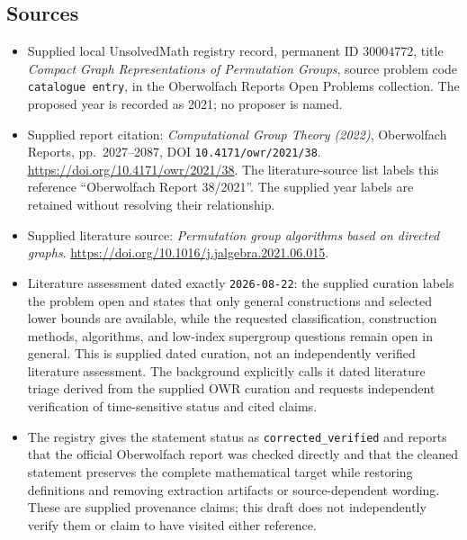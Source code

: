 \documentclass[11pt]{article}
\begin{document}
\subsection{Sources}
\begin{itemize}
\item Supplied local UnsolvedMath registry record, permanent ID \(30004772\), title \emph{Compact Graph Representations of Permutation Groups}, source problem code \texttt{catalogue entry}, in the Oberwolfach Reports Open Problems collection. The proposed year is recorded as 2021; no proposer is named.
\item Supplied report citation: \emph{Computational Group Theory (2022)}, Oberwolfach Reports, pp.\ 2027--2087, DOI \texttt{10.4171/owr/2021/38}. \url{https://doi.org/10.4171/owr/2021/38}. The literature-source list labels this reference ``Oberwolfach Report 38/2021''. The supplied year labels are retained without resolving their relationship.
\item Supplied literature source: \emph{Permutation group algorithms based on directed graphs}. \url{https://doi.org/10.1016/j.jalgebra.2021.06.015}.
\item Literature assessment dated exactly \texttt{2026-08-22}: the supplied curation labels the problem open and states that only general constructions and selected lower bounds are available, while the requested classification, construction methods, algorithms, and low-index supergroup questions remain open in general. This is supplied dated curation, not an independently verified literature assessment. The background explicitly calls it dated literature triage derived from the supplied OWR curation and requests independent verification of time-sensitive status and cited claims.
\item The registry gives the statement status as \texttt{corrected\_verified} and reports that the official Oberwolfach report was checked directly and that the cleaned statement preserves the complete mathematical target while restoring definitions and removing extraction artifacts or source-dependent wording. These are supplied provenance claims; this draft does not independently verify them or claim to have visited either reference.
\end{itemize}
\end{document}
